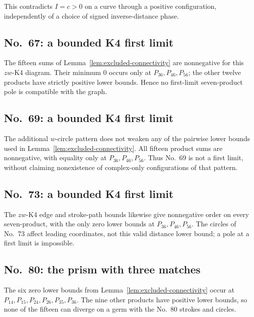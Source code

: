 \documentclass[11pt]{amsart}
\theoremstyle{remark}
\begin{document}
This contradicts $I=c>0$ on a curve through a
positive configuration, independently of a choice
of signed inverse-distance phase.
\subsection{No.~67: a bounded K4 first limit}
The fifteen sums of Lemma~\ref{lem:excluded-connectivity} are nonnegative for this $zw$-K4 diagram. Their minimum 0 occurs only at $P_{36},P_{46},P_{56}$; the other twelve products have strictly positive lower bounds. Hence no first-limit seven-product pole is compatible with the graph.

\subsection{No.~69: a bounded K4 first limit}
The additional $w$-circle pattern does not weaken any of the pairwise lower bounds used in Lemma~\ref{lem:excluded-connectivity}. All fifteen product sums are nonnegative, with equality only at $P_{36},P_{46},P_{56}$. Thus No.~69 is not a first limit, without claiming nonexistence of complex-only configurations of that pattern.

\subsection{No.~73: a bounded K4 first limit}
The $zw$-K4 edge and stroke-path bounds likewise give nonnegative order on every seven-product, with the only zero lower bounds at $P_{36},P_{46},P_{56}$. The circles of No.~73 affect leading coordinates, not this valid distance lower bound; a pole at a first limit is impossible.

\subsection{No.~80: the prism with three matches}
The six zero lower bounds from Lemma~\ref{lem:excluded-connectivity} occur at $P_{14},P_{15},P_{24},P_{26},P_{35},P_{36}$. The nine other products have positive lower bounds, so none of the fifteen can diverge on a germ with the No.~80 strokes and circles.
\end{document}
